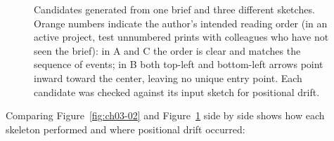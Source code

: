 \begin{figure}[htbp]
\begin{minipage}[t]{0.32\linewidth}
\end{minipage}
\caption{Candidates generated from one brief and three different sketches. Orange numbers indicate the author's intended reading order (in an active project, test unnumbered prints with colleagues who have not seen the brief): in A and C the order is clear and matches the sequence of events; in B both top-left and bottom-left arrows point inward toward the center, leaving no unique entry point. Each candidate was checked against its input sketch for positional drift.}\label{fig:ch03-03}
\end{figure}

Comparing Figure~\ref{fig:ch03-02} and Figure~\ref{fig:ch03-03} side by side shows how each skeleton performed and where positional drift occurred:


